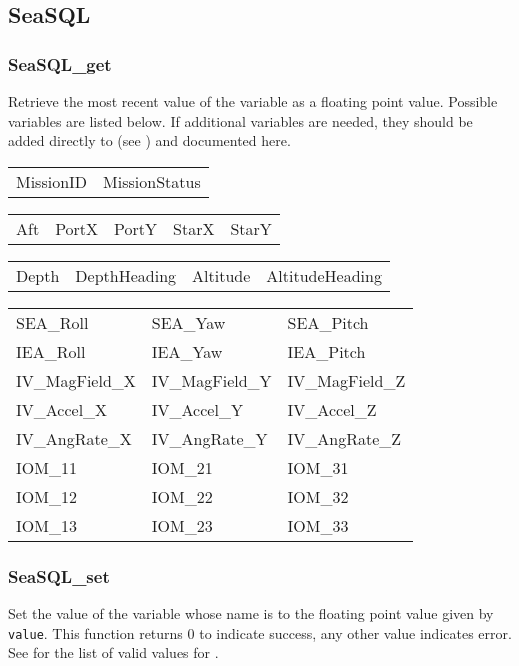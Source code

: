 \subsection{SeaSQL} \label{apiseasql}
\subsubsection{SeaSQL\_get} \label{apiseasqlget}
 Retrieve the most recent value of the
variable  as a floating point value.  Possible variables are listed
below. If additional variables are needed, they should be added directly to
\libseawolf{} (see ) and documented here.
\begin{center}
\begin{tabular}{l l}
MissionID & MissionStatus
\end{tabular}\vspace{5pt}

\begin{tabular}{l l l l l}
Aft & PortX & PortY & StarX & StarY
\end{tabular}\vspace{5pt}

\begin{tabular}{l l l l}
Depth & DepthHeading & Altitude & AltitudeHeading \\
\end{tabular}\vspace{5pt}

\begin{tabular}{l l l}
SEA\_Roll & SEA\_Yaw & SEA\_Pitch \\
IEA\_Roll & IEA\_Yaw & IEA\_Pitch \\
IV\_MagField\_X & IV\_MagField\_Y & IV\_MagField\_Z \\
IV\_Accel\_X & IV\_Accel\_Y & IV\_Accel\_Z \\
IV\_AngRate\_X & IV\_AngRate\_Y & IV\_AngRate\_Z \\
IOM\_11 & IOM\_21 & IOM\_31 \\
IOM\_12 & IOM\_22 & IOM\_32 \\
IOM\_13 & IOM\_23 & IOM\_33 \\
\end{tabular}
\end{center}

\subsubsection{SeaSQL\_set} \label{apiseasqlset}
 Set the value of the variable whose name
is  to the floating point value given by \texttt{value}. This
function returns 0 to indicate success, any other value indicates error. See
 for the list of valid
values for .

